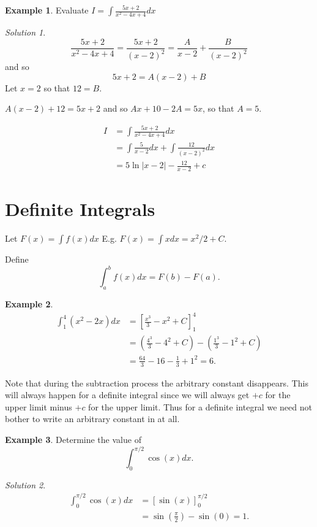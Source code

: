 \documentclass[
  11pt,
  oneside]{book}
\newcommand{\slide}{}
\theoremstyle{definition}
\theoremstyle{definition}
\newtheorem{example}{Example}[chapter]
\theoremstyle{definition}
\theoremstyle{definition}
\theoremstyle{remark}
\newtheorem*{solution}{Solution}
\begin{document}
\slide

\begin{example}
Evaluate \(I = \displaystyle\int\frac{5x+2}{x^2-4x+4} dx\)
\end{example}

\begin{solution}
\[
\frac{5x+2}{x^2-4x+4} = \frac{5x+2}{(x-2)^2} = \frac A{x-2}+\frac{B}{(x-2)^2}
\]
and so
\[
5x+2 = A(x-2)+B
\]
Let \(x=2\) so that \(12=B\).

\(A(x-2)+12 = 5x+2\) and so \(Ax+10-2A=5x\), so that \(A=5\).

\begin{align*}
I&= \int\frac{5x+2}{x^2-4x+4} dx\\
&=\int\frac5{x-2}dx+\int\frac{12}{(x-2)^2}dx\\
&=5\ln|x-2|-\frac{12}{x-2}+c
\end{align*}
\end{solution}

\slide

\section{Definite Integrals}\label{definite-integrals}

Let \(F(x) = \displaystyle\int f(x)dx\) E.g. \(F(x)=\displaystyle\int xdx = x^2/2 + C\).

Define
\[
\int_a^b f(x)dx = F(b)-F(a).
\]

\begin{example}
\begin{align*}
\int_1^4(x^2-2x)dx& = \left[\frac{x^3}{3}-x^2+C\right]_1^4\\
&=\left(\frac{4^3}{3}-4^2+C\right) - \left(\frac{1^3}{3}-1^2+C\right)\\
&=\frac{64}{3}-16-\frac{1}{3}+1^2 = 6.
\end{align*}
\end{example}

Note that during the subtraction process the arbitrary constant disappears. This will always happen for a definite integral since we will always get \(+ c\) for the upper limit minus \(+ c\) for the upper limit. Thus for a definite integral we need not bother to write an arbitrary constant in at all.
\slide

\begin{example}
Determine the value of
\[
\int_0^{\pi/2}\cos(x)dx.
\]
\end{example}

\begin{solution}
\begin{align*}
\int_0^{\pi/2}\cos(x)dx& = \left[\sin(x)\right]_0^{\pi/2}\\
&=\sin\left(\frac{\pi}{2}\right)-\sin(0) = 1.
\end{align*}
\end{solution}
\end{document}
